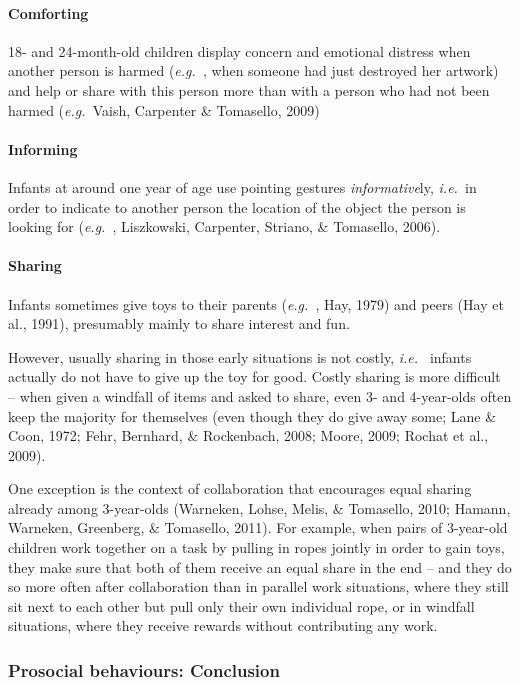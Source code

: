 \documentclass{article}
\newcommand{\ie}{{\textit{i.e.~}}}
\newcommand{\eg}{{\textit{e.g.~}}}
\begin{document}
\paragraph{Comforting}

18- and 24-month-old children display concern and emotional distress when
another person is harmed (\eg, when someone had just destroyed her artwork) and
help or share with this person more than with a person who had not been harmed
(\eg Vaish, Carpenter \& Tomasello, 2009) 

\paragraph{Informing}

Infants at around one year of age use pointing gestures \emph{informative}ly,
\ie in order to indicate to another person the location of the object the
person is looking for (\eg, Liszkowski, Carpenter, Striano, \& Tomasello, 2006).

\paragraph{Sharing}

Infants sometimes give toys to their parents (\eg, Hay, 1979) and peers
(Hay et al., 1991), presumably mainly to share interest and fun. 

However, usually sharing in those early situations is not costly, \ie
infants actually do not have to give up the toy for good. Costly sharing is
more difficult -- when given a windfall of items and asked to share, even 3- and
4-year-olds often keep the majority for themselves (even though they do give
away some; Lane \& Coon, 1972; Fehr, Bernhard, \& Rockenbach, 2008; Moore,
2009; Rochat et al., 2009). 

One exception is the context of collaboration that encourages equal
sharing already among 3-year-olds (Warneken, Lohse, Melis, \& Tomasello, 2010;
Hamann, Warneken, Greenberg, \& Tomasello, 2011). For example, when pairs of
3-year-old children work together on a task by pulling in ropes jointly in
order to gain toys, they make sure that both of them receive an equal share in
the end -- and they do so more often after collaboration than in parallel work
situations, where they still sit next to each other but pull only their own
individual rope, or in windfall situations, where they receive rewards without
contributing any work. 

\subsubsection{Prosocial behaviours: Conclusion}
\end{document}
